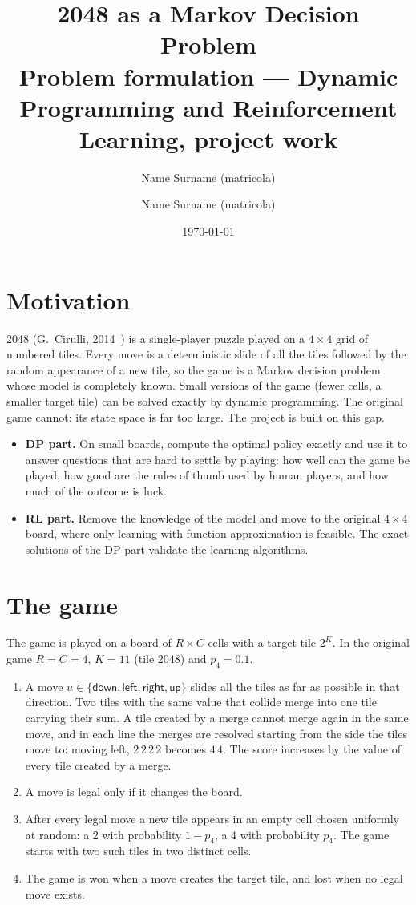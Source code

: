 \documentclass[11pt,a4paper]{article}
\title{2048 as a Markov Decision Problem\\[4pt]
\large Problem formulation --- Dynamic Programming and Reinforcement Learning, project work}
\author{Name Surname (matricola) \and Name Surname (matricola)}
\date{\today}
\theoremstyle{remark}
\newcommand{\act}[1]{\textsf{#1}}
\begin{document}
\maketitle

\section{Motivation}

2048 (G.~Cirulli, 2014~\cite{cirulli}) is a single-player puzzle played on a $4\times4$ grid of numbered tiles. Every move is a deterministic slide of all the tiles followed by the random appearance of a new tile, so the game is a Markov decision problem whose model is completely known. Small versions of the game (fewer cells, a smaller target tile) can be solved exactly by dynamic programming. The original game cannot: its state space is far too large. The project is built on this gap.

\begin{itemize}[leftmargin=*]
\item \textbf{DP part.} On small boards, compute the optimal policy exactly and use it to answer questions that are hard to settle by playing: how well can the game be played, how good are the rules of thumb used by human players, and how much of the outcome is luck.
\item \textbf{RL part.} Remove the knowledge of the model and move to the original $4\times4$ board, where only learning with function approximation is feasible. The exact solutions of the DP part validate the learning algorithms.
\end{itemize}

\section{The game}

The game is played on a board of $R\times C$ cells with a target tile $2^K$. In the original game $R=C=4$, $K=11$ (tile 2048) and $p_4=0.1$.

\begin{enumerate}[leftmargin=*]
\item A move $u\in\{\act{down},\act{left},\act{right},\act{up}\}$ slides all the tiles as far as possible in that direction. Two tiles with the same value that collide merge into one tile carrying their sum. A tile created by a merge cannot merge again in the same move, and in each line the merges are resolved starting from the side the tiles move to: moving left, $2\,2\,2\,2$ becomes $4\,4$. The score increases by the value of every tile created by a merge.
\item A move is legal only if it changes the board.
\item After every legal move a new tile appears in an empty cell chosen uniformly at random: a 2 with probability $1-p_4$, a 4 with probability $p_4$. The game starts with two such tiles in two distinct cells.
\item The game is won when a move creates the target tile, and lost when no legal move exists.
\end{enumerate}
\end{document}
